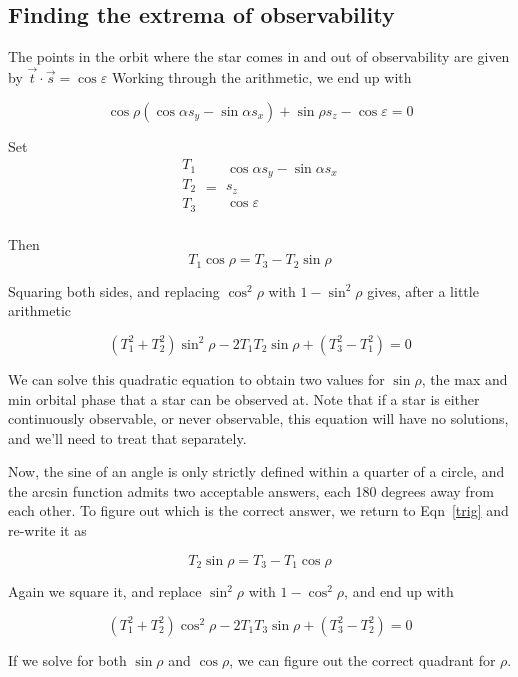 \documentclass[11pt]{article}
\renewcommand{\hat}[1]{\ensuremath{\vec{#1}}}
\newcommand{\vareps}{\varepsilon}
\begin{document}
    
\subsection{Finding the extrema of observability}
The points in the orbit where the star comes in and out of observability are given by $\hat{t} \cdot \hat{s} = \cos{\vareps}$
Working through the arithmetic, we end up with

\begin{equation}
\cos{\rho} (\cos{\alpha} s_y - \sin{\alpha} s_x) + \sin{\rho} s_z - \cos{\vareps} = 0
\end{equation}

Set
\begin{equation}
\begin{matrix}
T_1 \\
T_2 \\
T_3 \\
\end{matrix}
=
\begin{matrix}
\cos{\alpha} s_y - \sin{\alpha} s_x \\
s_z \\
\cos{\vareps} \\
\end{matrix}
\end{equation}

Then 
\begin{equation}
T_1\cos{\rho} = T_3 - T_2 \sin{\rho}  \label{trig}
\end{equation}

Squaring both sides, and replacing $\cos^2{\rho}$ with $1 - \sin^2{\rho}$ gives, after a little arithmetic

\begin{equation}
(T_1^2 + T_2^2) \sin^2{\rho} - 2T_1 T_2 \sin{\rho} + (T_3^2 - T_1^2) = 0
\end{equation}

We can solve this quadratic equation to obtain two values for $\sin{\rho}$, the max and min orbital phase that a star can be observed at. Note that if a star is either continuously observable, or never observable, this equation will have no solutions, and we'll need to treat that separately.

Now, the sine of an angle is only strictly defined within a quarter of a circle, and the arcsin function admits two acceptable answers, each 180 degrees away from each other. To figure out which is the correct answer, we return to Eqn~\ref{trig} and re-write it as 

$$T_2 \sin{\rho}  = T_3 - T_1\cos{\rho}  $$

Again we square it, and replace $\sin^2{\rho}$ with $1- \cos^2{\rho}$, and end up with 

$$
(T_1^2 + T_2^2) \cos^2{\rho} - 2T_1 T_3 \sin{\rho} + (T_3^2 - T_2^2) = 0
$$

If we solve for both $\sin{\rho}$ and $\cos{\rho}$, we can figure out the correct quadrant for $\rho$.
\end{document}
